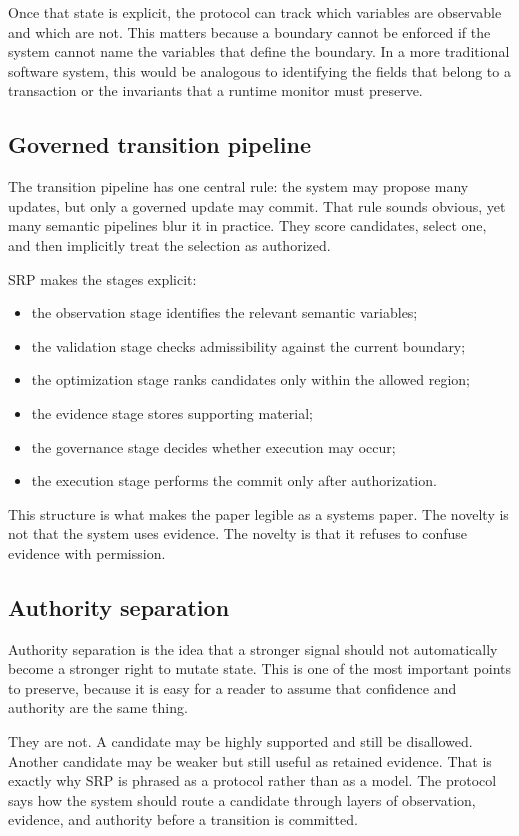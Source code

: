 \documentclass[10pt]{article}
\begin{document}
Once that state is explicit, the protocol can track which variables are observable and which are not. This matters because a boundary cannot be enforced if the system cannot name the variables that define the boundary. In a more traditional software system, this would be analogous to identifying the fields that belong to a transaction or the invariants that a runtime monitor must preserve.

\subsection*{Governed transition pipeline}
The transition pipeline has one central rule: the system may propose many updates, but only a governed update may commit. That rule sounds obvious, yet many semantic pipelines blur it in practice. They score candidates, select one, and then implicitly treat the selection as authorized.

SRP makes the stages explicit:
\begin{itemize}
  \item the observation stage identifies the relevant semantic variables;
  \item the validation stage checks admissibility against the current boundary;
  \item the optimization stage ranks candidates only within the allowed region;
  \item the evidence stage stores supporting material;
  \item the governance stage decides whether execution may occur;
  \item the execution stage performs the commit only after authorization.
\end{itemize}

This structure is what makes the paper legible as a systems paper. The novelty is not that the system uses evidence. The novelty is that it refuses to confuse evidence with permission.

\subsection*{Authority separation}
Authority separation is the idea that a stronger signal should not automatically become a stronger right to mutate state. This is one of the most important points to preserve, because it is easy for a reader to assume that confidence and authority are the same thing.

They are not. A candidate may be highly supported and still be disallowed. Another candidate may be weaker but still useful as retained evidence. That is exactly why SRP is phrased as a protocol rather than as a model. The protocol says how the system should route a candidate through layers of observation, evidence, and authority before a transition is committed.
\end{document}
